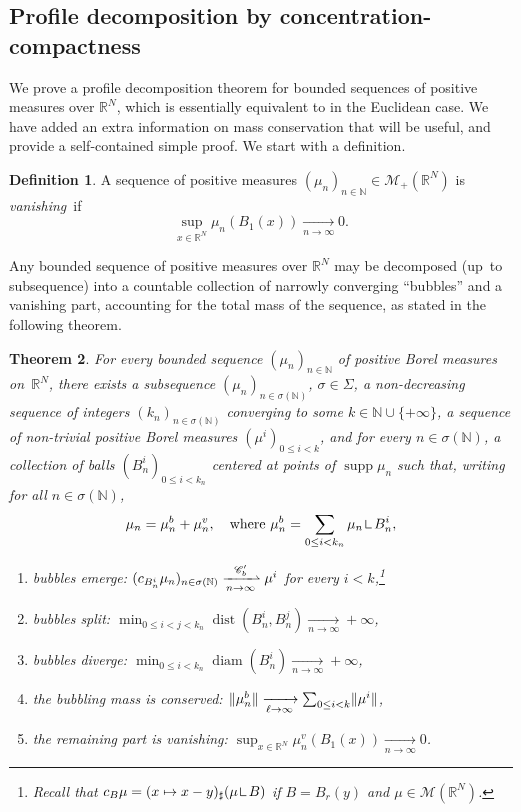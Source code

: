 \documentclass[10pt]{amsart}
\theoremstyle{plain}
\newtheorem{theorem}{Theorem}[section]
\theoremstyle{definition}
\newtheorem{definition}[theorem]{Definition}
\newcommand{\N}{\mathbb{N}}
\newcommand{\R}{\mathbb{R}}
\newcommand{\Cspace}{\mathscr{C}}
\newcommand{\Mspace}{\mathscr{M}}
\newcommand{\mres}{\mathop{\hbox{\vrule height 6pt width .5pt depth 0pt \vrule height .5pt width 4pt depth 0pt}}\nolimits}
\DeclarePairedDelimiter{\norm}{\lVert}{\rVert}
\DeclareMathOperator{\supp}{supp}
\DeclareMathOperator{\diam}{diam}
\DeclareMathOperator{\dist}{dist}
\newcommand{\xto}[2][]{\xrightarrow[#2]{#1}}
\newcommand{\xnarrowto}[1]{\xrightharpoonup[#1]{\Cspace_b'}}
\begin{document}
\subsection{Profile decomposition by concentration-compactness}

We prove a profile decomposition theorem for bounded sequences of positive measures over $\R^N$, which is essentially equivalent to \cite[Th.\,1.5]{marisProfileDecompositionSequences2014} in the Euclidean case. We have added an extra information on mass conservation that will be useful, and provide a self-contained simple proof. We start with a definition.

\begin{definition}\label{DefinitionVanishing}
A sequence of positive measures $(\mu_n)_{n\in\N} \!\in\! \Mspace_+(\R^N)$ is \emph{vanishing}~if
\[\sup_{x\in \R^N} \mu_n(B_1(x)) \xto{n\to \infty} 0.\]
\end{definition}

Any bounded sequence of positive measures over $\R^N$ may be decomposed (up~to subsequence) into a countable collection of narrowly converging \enquote{bubbles} and a vanishing part, accounting for the total mass of the sequence, as stated in the following theorem.

\begin{theorem}\label{profileDecomposition}
For every bounded sequence \((\mu_n)_{n\in\N}\) of positive Borel measures on~\(\R^N\), there exists a subsequence \((\mu_n)_{n \in \sigma(\N)}\), $\sigma \in \Sigma$, a non-decreasing sequence of integers $(k_n)_{n \in \sigma(\N)}$ converging to some $k \in \N \cup \{+\infty\}$, a sequence of non-trivial positive Borel measures $(\mu^i)_{0\le i<k}$, and for every $n \in \sigma(\N)$, a collection of balls $(B^i_n)_{0 \leq i < k_n}$ centered at points of $\supp \mu_n$ such that, writing for all $n\in \sigma(\N)$,
\begin{equation}
\mu_n = \mu^b_n + \mu^v_n,\quad \text{where } \mu^b_n = \sum_{0\le i < k_n} \mu_n \mres B_n^i,
\end{equation}
\vspace*{-5pt}
\begin{enumerate}[\textnormal(\textup{\Alph*}\textnormal),leftmargin=1.3\normalparindent]
\item\label{bubbleEmergence} bubbles emerge: $(c_{B_{n}^i} \mu_{n})_{n\in\sigma(\N)}\xnarrowto{n\to\infty}\mu^i$ for every $i<k$,\footnote{Recall that $c_B \mu = (x\mapsto x-y)_\sharp(\mu \mres B)$ if $B = B_r(y)$ and $\mu \in \Mspace(\R^N)$.}
\item\label{bubbleSplitting} bubbles split: $\min_{0\le i<j< k_{n}}\dist(B_{n}^i,B_{n}^j) \xto{n\to\infty} +\infty$,
\item\label{bubbleDivergence} bubbles diverge: $ \min_{0\le i< k_n}\diam(B_{n}^i) \xto{n\to\infty} +\infty$,
\item\label{bubblingMassConservation} the bubbling mass is conserved: $\norm{\mu^b_{n}} \xto{\ell \to \infty} \sum_{0\le i<k} \norm{\mu^i}$,
\item\label{remainingVanishing} the remaining part is vanishing: $\sup_{x\in \R^N} \mu^v_{n}(B_1(x)) \xto{n\to\infty} 0$.
\end{enumerate}
\end{theorem}
\end{document}
